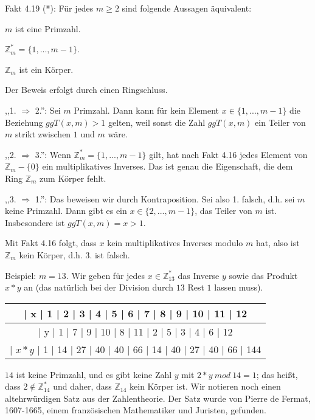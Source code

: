 \documentclass[a4paper]{article}
\begin{document}
\begin{multicols}{3}
    Fakt 4.19 (*): Für jedes $m\geq 2$ sind folgende Aussagen äquivalent:
    \begin{enumerate*}
        \item $m$ ist eine Primzahl.
        \item $\mathbb{Z}^*_m=\{ 1 ,...,m-1\}$.
        \item $\mathbb{Z}_m$ ist ein Körper.
    \end{enumerate*}

    Der Beweis erfolgt durch einen Ringschluss.
    \begin{itemize*}
        \item ,,1. $\Rightarrow$ 2.'': Sei $m$ Primzahl. Dann kann für kein Element $x\in\{1 ,...,m-1\}$ die Beziehung $ggT(x,m)>1$ gelten, weil sonst die Zahl $ggT(x,m)$ ein Teiler von $m$ strikt zwischen $1$ und $m$ wäre.
        \item ,,2. $\Rightarrow$ 3.'': Wenn $\mathbb{Z}^*_m=\{1 ,...,m-1\}$ gilt, hat nach Fakt 4.16 jedes Element von $\mathbb{Z}_m -\{0\}$ ein multiplikatives Inverses. Das ist genau die Eigenschaft, die dem Ring $\mathbb{Z}_m$ zum Körper fehlt.
        \item ,,3. $\Rightarrow$ 1.'': Das beweisen wir durch Kontraposition. Sei also 1. falsch, d.h. sei $m$ keine Primzahl. Dann gibt es ein $x\in\{2,...,m-1\}$, das Teiler von $m$ ist. Insbesondere ist $ggT(x,m) =x >1$.
        \item Mit Fakt 4.16 folgt, dass $x$ kein multiplikatives Inverses modulo $m$ hat, also ist $\mathbb{Z}_m$ kein Körper, d.h. 3. ist falsch.
    \end{itemize*}

    Beispiel: $m=13$. Wir geben für jedes $x\in\mathbb{Z}^*_{13}$ das Inverse $y$ sowie das Produkt $x*y$ an (das natürlich bei der Division durch $13$ Rest $1$ lassen muss).
    \begin{tabular}{c}
        | x   | 1  | 2  | 3  | 4  | 5  | 6  | 7  | 8  | 9  | 10 | 11 | 12 \\\hline
        | y   | 1  | 7  | 9  | 10 | 8  | 11 | 2  | 5  | 3  | 4  | 6  | 12 \\
        | $x*y$ | 1  | 14 | 27 | 40 | 40 | 66 | 14 | 40 | 27 | 40 | 66 | 144
    \end{tabular}

    $14$ ist keine Primzahl, und es gibt keine Zahl $y$ mit $2*y\ mod\ 14 = 1$; das heißt, dass $2\not\in\mathbb{Z}^*_{14}$ und daher, dass $\mathbb{Z}_{14}$ kein Körper ist.
    Wir notieren noch einen altehrwürdigen Satz aus der Zahlentheorie. Der Satz wurde von Pierre de Fermat, 1607-1665, einem französischen Mathematiker und Juristen, gefunden.


\end{multicols}
\end{document}
